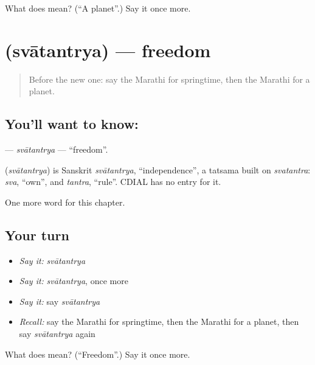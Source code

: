 \begin{tcolorbox}[breakable,colback=teal!4,colframe=teal!35!black,title={Before you move on}]
What does  mean? (\textquotedblleft{}A planet\textquotedblright{}.) Say it once more.
\end{tcolorbox}
\section[\texorpdfstring{\mr{स्वातंत्र्य} (svātantrya)}{स्वातंत्र्य (svātantrya)}]{ (svātantrya) — freedom}

\label{lesson:MR-C246-svatantrya}



\begin{quote}
Before the new one: say the Marathi for springtime, then the Marathi for a planet.
\end{quote}

\subsection*{You'll want to know: }
\textbf{} — \emph{svātantrya} — \textquotedblleft{}freedom\textquotedblright{}.

\begin{cousinweb}
\textbf{} (\emph{svātantrya}) is Sanskrit \emph{svātantrya}, \textquotedblleft{}independence\textquotedblright{}, a tatsama built on \emph{svatantra}: \emph{sva}, \textquotedblleft{}own\textquotedblright{}, and \emph{tantra}, \textquotedblleft{}rule\textquotedblright{}. CDIAL has no entry for it.
\end{cousinweb}

\begin{grammarlens}[title={What you've built}]
One more word for this chapter.
\end{grammarlens}

\subsection*{Your turn}
\begin{itemize}
\raggedright
  \item \emph{Say it:} \emph{svātantrya}
  \item \emph{Say it:} \emph{svātantrya}, once more
  \item \emph{Say it:} say \emph{svātantrya}
  \item \emph{Recall:} say the Marathi for springtime, then the Marathi for a planet, then say \emph{svātantrya} again
\end{itemize}

\begin{tcolorbox}[breakable,colback=teal!4,colframe=teal!35!black,title={Before you move on}]
What does  mean? (\textquotedblleft{}Freedom\textquotedblright{}.) Say it once more.
\end{tcolorbox}

